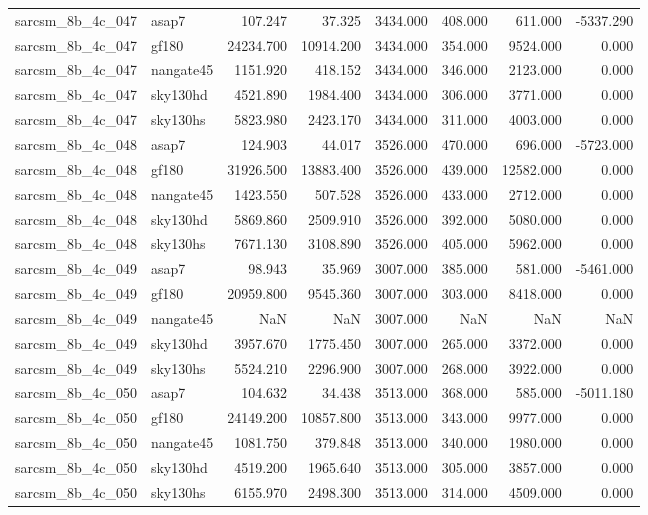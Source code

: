 \begin{tabular}{llrrrrrr}
sarcsm\_8b\_4c\_047 & asap7 & 107.247 & 37.325 & 3434.000 & 408.000 & 611.000 & -5337.290 \\
sarcsm\_8b\_4c\_047 & gf180 & 24234.700 & 10914.200 & 3434.000 & 354.000 & 9524.000 & 0.000 \\
sarcsm\_8b\_4c\_047 & nangate45 & 1151.920 & 418.152 & 3434.000 & 346.000 & 2123.000 & 0.000 \\
sarcsm\_8b\_4c\_047 & sky130hd & 4521.890 & 1984.400 & 3434.000 & 306.000 & 3771.000 & 0.000 \\
sarcsm\_8b\_4c\_047 & sky130hs & 5823.980 & 2423.170 & 3434.000 & 311.000 & 4003.000 & 0.000 \\
sarcsm\_8b\_4c\_048 & asap7 & 124.903 & 44.017 & 3526.000 & 470.000 & 696.000 & -5723.000 \\
sarcsm\_8b\_4c\_048 & gf180 & 31926.500 & 13883.400 & 3526.000 & 439.000 & 12582.000 & 0.000 \\
sarcsm\_8b\_4c\_048 & nangate45 & 1423.550 & 507.528 & 3526.000 & 433.000 & 2712.000 & 0.000 \\
sarcsm\_8b\_4c\_048 & sky130hd & 5869.860 & 2509.910 & 3526.000 & 392.000 & 5080.000 & 0.000 \\
sarcsm\_8b\_4c\_048 & sky130hs & 7671.130 & 3108.890 & 3526.000 & 405.000 & 5962.000 & 0.000 \\
sarcsm\_8b\_4c\_049 & asap7 & 98.943 & 35.969 & 3007.000 & 385.000 & 581.000 & -5461.000 \\
sarcsm\_8b\_4c\_049 & gf180 & 20959.800 & 9545.360 & 3007.000 & 303.000 & 8418.000 & 0.000 \\
sarcsm\_8b\_4c\_049 & nangate45 & NaN & NaN & 3007.000 & NaN & NaN & NaN \\
sarcsm\_8b\_4c\_049 & sky130hd & 3957.670 & 1775.450 & 3007.000 & 265.000 & 3372.000 & 0.000 \\
sarcsm\_8b\_4c\_049 & sky130hs & 5524.210 & 2296.900 & 3007.000 & 268.000 & 3922.000 & 0.000 \\
sarcsm\_8b\_4c\_050 & asap7 & 104.632 & 34.438 & 3513.000 & 368.000 & 585.000 & -5011.180 \\
sarcsm\_8b\_4c\_050 & gf180 & 24149.200 & 10857.800 & 3513.000 & 343.000 & 9977.000 & 0.000 \\
sarcsm\_8b\_4c\_050 & nangate45 & 1081.750 & 379.848 & 3513.000 & 340.000 & 1980.000 & 0.000 \\
sarcsm\_8b\_4c\_050 & sky130hd & 4519.200 & 1965.640 & 3513.000 & 305.000 & 3857.000 & 0.000 \\
sarcsm\_8b\_4c\_050 & sky130hs & 6155.970 & 2498.300 & 3513.000 & 314.000 & 4509.000 & 0.000 \\

\end{tabular}
